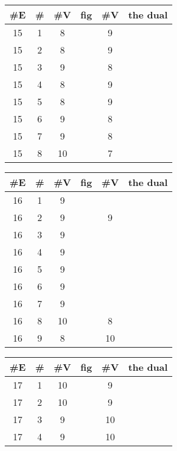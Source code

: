 \documentclass{amsart}
\begin{document}
\begin{table}[ht]
\begin{tabular}{|c|c|c|c || c|c|}
      \#E & \# & \#V & fig & \#V &the dual\\
\hline
15 & 1 & 8   &  &%
         9   &   \\%
15 & 2 & 8   &  &%
         9   &   \\%
15 & 3 & 9   &  &%
         8   &   \\%
15 & 4 & 8   &  &%
         9   &   \\%
15 & 5 & 8   &  &%
         9   &   \\%
15 & 6 & 9   &  &%
         8   &   \\%
15 & 7 & 9   &  &%
         8   &   \\%
15 & 8 & 10  &   &%
         7   &   \\%
\end{tabular}
\end{table}
\begin{table}[ht]
     \begin{tabular}{|c|c|c|c || c|c|}
\#E & \# & \#V & fig & \#V &the dual\\
      \hline
16 & 1 & 9   &   \\%
16 & 2 & 9   &  &%
         9   &   \\%
16 & 3 & 9   &   \\%
16 & 4 & 9   &   \\%
16 & 5 & 9   &   \\%
16 & 6 & 9   &   \\%
16 & 7 & 9   &   \\%
16 & 8 & 10  &   &%
         8   &   \\%
16 & 9 & 8   &  &%
         10  &    \\%
\end{tabular}
\end{table}
\begin{table}[ht]
     \begin{tabular}{|c|c|c|c || c|c|}
      \#E & \# & \#V & fig & \#V &the dual\\
\hline
17 & 1 & 10  &   &%
         9   &   \\%
17 & 2 & 10  &   &%
         9   &   \\%
17 & 3 & 9   &  &%
         10  &    \\%
17 & 4 & 9   &  &%
         10  &    \\%
\end{tabular}
\end{table}
\end{document}
